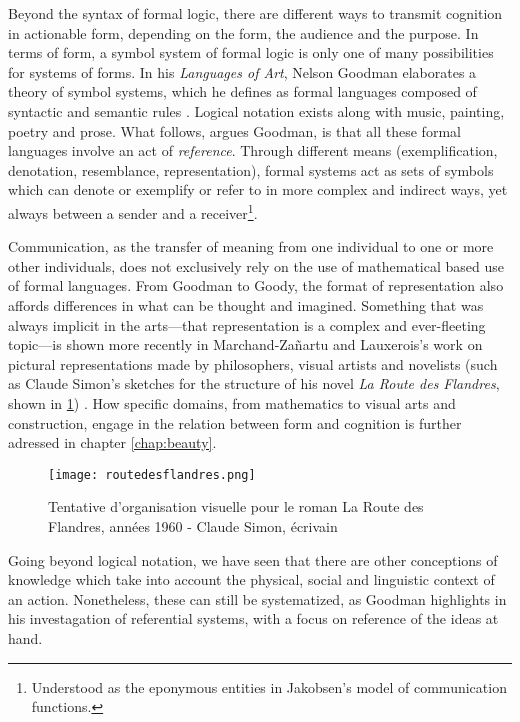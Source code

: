 Beyond the syntax of formal logic, there are different ways to transmit cognition in actionable form, depending on the form, the audience and the purpose. In terms of form, a symbol system of formal logic is only one of many possibilities for systems of forms. In his \emph{Languages of Art}, Nelson Goodman elaborates a theory of symbol systems, which he defines as formal languages composed of syntactic and semantic rules \citep{goodman_languages_1976}. Logical notation exists along with music, painting, poetry and prose. What follows, argues Goodman, is that all these formal languages involve an act of \emph{reference}. Through different means (exemplification, denotation, resemblance, representation), formal systems act as sets of symbols which can denote or exemplify or refer to in more complex and indirect ways, yet always between a sender and a receiver\footnote{Understood as the eponymous entities  in Jakobsen's model of communication functions.}.

Communication, as the transfer of meaning from one individual to one or more other individuals, does not exclusively rely on the use of mathematical based use of formal languages. From Goodman to Goody, the format of representation also affords differences in what can be thought and imagined. Something that was always implicit in the arts—that representation is a complex and ever-fleeting topic—is shown more recently in Marchand-Zañartu and Lauxerois's work on pictural representations made by philosophers, visual artists and novelists (such as Claude Simon's sketches for the structure of his novel \emph{La Route des Flandres}, shown in \ref{graphic:routedesflandres}) \citep{marchand-zanartu_32_2022}. How specific domains, from mathematics to visual arts and construction, engage in the relation between form and cognition is further adressed in chapter \ref{chap:beauty}.

\begin{figure}
    \begin{center}
        \texttt{[image: routedesflandres.png]}
        \caption{Tentative d'organisation visuelle pour le roman La Route des Flandres, années 1960 - Claude Simon, écrivain}
        \label{graphic:routedesflandres}
    \end{center}
\end{figure}

Going beyond logical notation, we have seen that there are other conceptions of knowledge which take into account the physical, social and linguistic context of an action. Nonetheless, these can still be systematized, as Goodman highlights in his investagation of referential systems, with a focus on reference of the ideas at hand.

